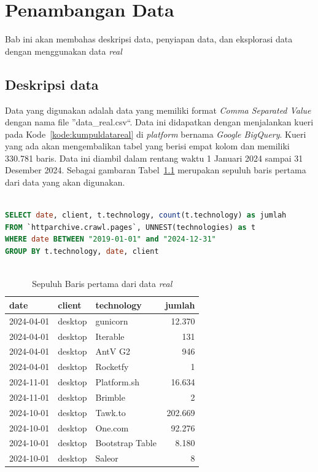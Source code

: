 \chapter{Penambangan Data}
\label{ch:penambangan}

Bab ini akan membahas deskripsi data, penyiapan data, dan eksplorasi data dengan menggunakan data \textit{real}

\section{Deskripsi data}
\label{sec:descdat}

Data yang digunakan adalah data yang memiliki format \textit{Comma Separated Value} dengan nama file ''data\_real.csv``. Data ini didapatkan dengan menjalankan kueri pada Kode~\ref{kode:kumpuldatareal} di \textit{platform} bernama \textit{Google BigQuery}. Kueri yang ada akan mengembalikan tabel yang berisi empat kolom dan memiliki 330.781 baris. Data ini diambil dalam rentang waktu 1 Januari 2024 sampai 31 Desember 2024. Sebagai gambaran Tabel~\ref{tab:sepuluhreal} merupakan sepuluh baris pertama dari data yang akan digunakan.

\begin{lstlisting}[language=SQL, caption=Kode untuk mengumpulkan data \textit{real}, label=kode:kumpuldatareal]

SELECT date, client, t.technology, count(t.technology) as jumlah
FROM `httparchive.crawl.pages`, UNNEST(technologies) as t 
WHERE date BETWEEN "2019-01-01" and "2024-12-31"
GROUP BY t.technology, date, client
    
\end{lstlisting}
\begin{table}[H]
\centering
\caption{Sepuluh Baris pertama dari data \textit{real}}
\label{tab:sepuluhreal}
\begin{tabular}{|l|l|l|r|}
\hline
date & client & technology & jumlah \\ \hline
2024-04-01 & desktop & gunicorn & 12.370 \\ \hline
2024-04-01 & desktop & Iterable & 131 \\ \hline
2024-04-01 & desktop & AntV G2 & 946 \\ \hline
2024-04-01 & desktop & Rocketfy & 1 \\ \hline
2024-11-01 & desktop & Platform.sh & 16.634 \\ \hline
2024-11-01 & desktop & Brimble & 2 \\ \hline
2024-10-01 & desktop & Tawk.to & 202.669 \\ \hline
2024-10-01 & desktop & One.com & 92.276 \\ \hline
2024-10-01 & desktop & Bootstrap Table & 8.180 \\ \hline
2024-10-01 & desktop & Saleor & 8 \\ \hline
\end{tabular}
\end{table}

